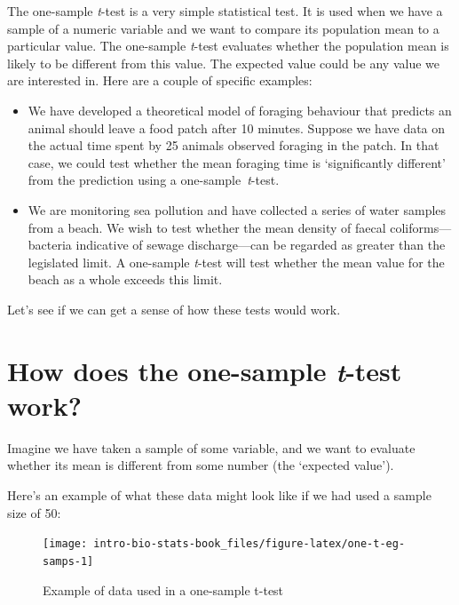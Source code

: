 \documentclass[
]{book}
\begin{document}
The one-sample \emph{t}-test is a very simple statistical test. It is used when we have a sample of a numeric variable and we want to compare its population mean to a particular value. The one-sample \emph{t}-test evaluates whether the population mean is likely to be different from this value. The expected value could be any value we are interested in. Here are a couple of specific examples:

\begin{itemize}
\item
  We have developed a theoretical model of foraging behaviour that predicts an animal should leave a food patch after 10 minutes. Suppose we have data on the actual time spent by 25 animals observed foraging in the patch. In that case, we could test whether the mean foraging time is `significantly different' from the prediction using a one-sample~\emph{t}-test.
\item
  We are monitoring sea pollution and have collected a series of water samples from a beach. We wish to test whether the mean density of faecal coliforms---bacteria indicative of sewage discharge---can be regarded as greater than the legislated limit. A one-sample \emph{t}-test will test whether the mean value for the beach as a whole exceeds this limit.
\end{itemize}

Let's see if we can get a sense of how these tests would work.

\hypertarget{how-does-the-one-sample-t-test-work}{%
\section{\texorpdfstring{How does the one-sample \emph{t}-test work?}{How does the one-sample t-test work?}}\label{how-does-the-one-sample-t-test-work}}

Imagine we have taken a sample of some variable, and we want to evaluate whether its mean is different from some number (the `expected value').

Here's an example of what these data might look like if we had used a sample size of 50:

\begin{figure}

{\centering \texttt{[image: intro-bio-stats-book\_files/figure-latex/one-t-eg-samps-1]} 

}

\caption{Example of data used in a one-sample t-test}\label{fig:one-t-eg-samps}
\end{figure}
\end{document}
